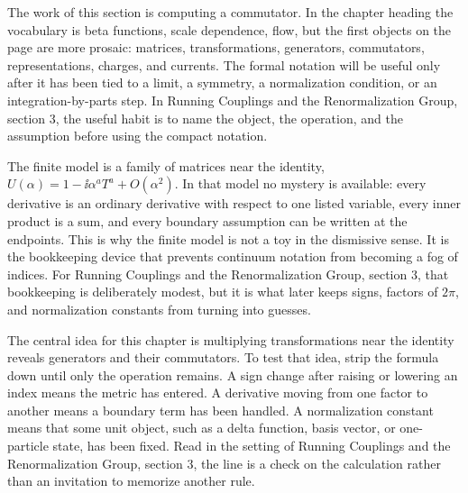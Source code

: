 











The work of this section is computing a commutator.  In the chapter heading the vocabulary is beta functions, scale dependence, flow, but the first objects on the page are more prosaic: matrices, transformations, generators, commutators, representations, charges, and currents.  The formal notation will be useful only after it has been tied to a limit, a symmetry, a normalization condition, or an integration-by-parts step.  In Running Couplings and the Renormalization Group, section 3, the useful habit is to name the object, the operation, and the assumption before using the compact notation.

The finite model is a family of matrices near the identity, \(U(\alpha)=1-\ii\alpha^aT^a+O(\alpha^2)\).  In that model no mystery is available: every derivative is an ordinary derivative with respect to one listed variable, every inner product is a sum, and every boundary assumption can be written at the endpoints.  This is why the finite model is not a toy in the dismissive sense.  It is the bookkeeping device that prevents continuum notation from becoming a fog of indices.  For Running Couplings and the Renormalization Group, section 3, that bookkeeping is deliberately modest, but it is what later keeps signs, factors of \(2\pi\), and normalization constants from turning into guesses.

The central idea for this chapter is multiplying transformations near the identity reveals generators and their commutators.  To test that idea, strip the formula down until only the operation remains.  A sign change after raising or lowering an index means the metric has entered.  A derivative moving from one factor to another means a boundary term has been handled.  A normalization constant means that some unit object, such as a delta function, basis vector, or one-particle state, has been fixed.  Read in the setting of Running Couplings and the Renormalization Group, section 3, the line is a check on the calculation rather than an invitation to memorize another rule.

